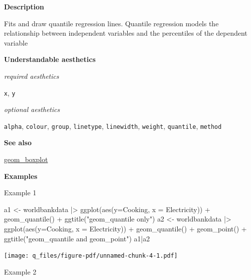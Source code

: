 \documentclass[
  letterpaper,
  DIV=11,
  numbers=noendperiod]{scrreprt}
\newenvironment{Shaded}{\begin{snugshade}}{\end{snugshade}}
\newcommand{\AttributeTok}[1]{\textcolor[rgb]{0.40,0.45,0.13}{#1}}
\newcommand{\FunctionTok}[1]{\textcolor[rgb]{0.28,0.35,0.67}{#1}}
\newcommand{\NormalTok}[1]{\textcolor[rgb]{0.00,0.23,0.31}{#1}}
\newcommand{\OtherTok}[1]{\textcolor[rgb]{0.00,0.23,0.31}{#1}}
\newcommand{\SpecialCharTok}[1]{\textcolor[rgb]{0.37,0.37,0.37}{#1}}
\newcommand{\StringTok}[1]{\textcolor[rgb]{0.13,0.47,0.30}{#1}}
\begin{document}
\textbf{Description}

Fits and draw quantile regression lines. Quantile regression models the
relationship between independent variables and the percentiles of the
dependent variable

\textbf{Understandable aesthetics}

\emph{required aesthetics}

\texttt{x}, \texttt{y}

\emph{optional aesthetics}

\texttt{alpha}, \texttt{colour}, \texttt{group}, \texttt{linetype},
\texttt{linewidth}, \texttt{weight}, \texttt{quantile}, \texttt{method}

\textbf{See also}

\hyperref[boxplot]{geom\_boxplot}

\textbf{Examples}

Example 1

\begin{Shaded}
\begin{Highlighting}[]
\NormalTok{a1 }\OtherTok{\textless{}{-}}\NormalTok{ worldbankdata }\SpecialCharTok{|\textgreater{}}
  \FunctionTok{ggplot}\NormalTok{(}\FunctionTok{aes}\NormalTok{(}\AttributeTok{y=}\NormalTok{Cooking, }\AttributeTok{x =}\NormalTok{ Electricity)) }\SpecialCharTok{+} 
  \FunctionTok{geom\_quantile}\NormalTok{() }\SpecialCharTok{+} \FunctionTok{ggtitle}\NormalTok{(}\StringTok{"geom\_quantile only"}\NormalTok{)}
\NormalTok{a2 }\OtherTok{\textless{}{-}}\NormalTok{ worldbankdata }\SpecialCharTok{|\textgreater{}}
  \FunctionTok{ggplot}\NormalTok{(}\FunctionTok{aes}\NormalTok{(}\AttributeTok{y=}\NormalTok{Cooking, }\AttributeTok{x =}\NormalTok{ Electricity)) }\SpecialCharTok{+} 
  \FunctionTok{geom\_quantile}\NormalTok{() }\SpecialCharTok{+} 
  \FunctionTok{geom\_point}\NormalTok{() }\SpecialCharTok{+}
  \FunctionTok{ggtitle}\NormalTok{(}\StringTok{"geom\_quantile and geom\_point"}\NormalTok{)}
\NormalTok{a1}\SpecialCharTok{|}\NormalTok{a2}
\end{Highlighting}
\end{Shaded}

\texttt{[image: q\_files/figure-pdf/unnamed-chunk-4-1.pdf]}

Example 2
\end{document}
